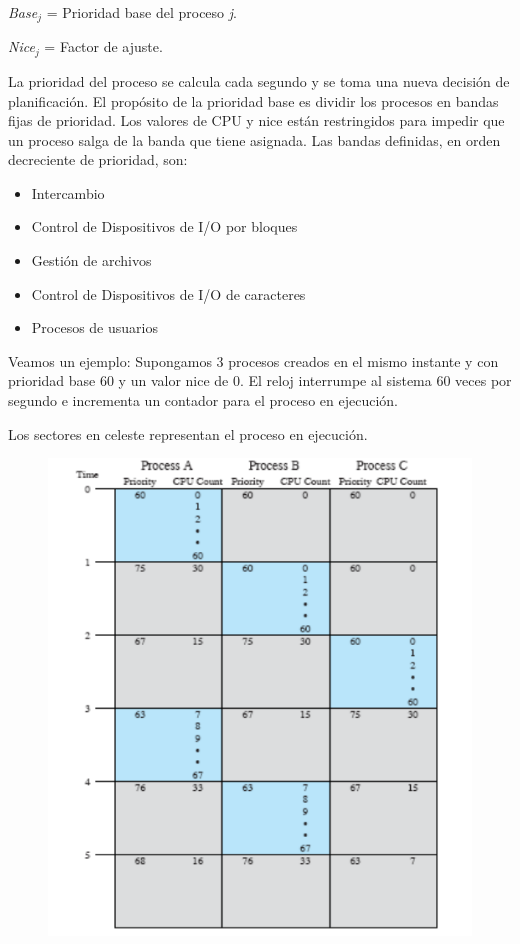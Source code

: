 \begin{questions}
\hspace{20pt} \emph{Base$_{j}$} = Prioridad base del proceso \emph{j}.

\hspace{20pt} \emph{Nice$_{j}$} = Factor de ajuste.

La prioridad del proceso se calcula cada segundo y se toma una nueva decisión de planificación. El propósito de la prioridad base es dividir los procesos en bandas fijas de prioridad. Los valores de CPU y nice están restringidos para impedir que un proceso salga de la banda que tiene asignada. Las bandas definidas, en orden
decreciente de prioridad, son:
\begin{itemize}
	\item Intercambio
	\item Control de Dispositivos de I/O por bloques
	\item Gestión de archivos
	\item Control de Dispositivos de I/O de caracteres
	\item Procesos de usuarios
\end{itemize}
Veamos un ejemplo:
Supongamos 3 procesos creados en el mismo instante y con prioridad base 60 y un valor nice de 0. El reloj interrumpe al sistema 60 veces por segundo e incrementa un contador para el proceso en ejecución.

Los sectores en celeste representan el proceso en ejecución.
\begin{figure}[h]
	\centering
	\includegraphics[scale=0.5]{images/unix_classic_real_case.png}
\end{figure}


\end{questions}
